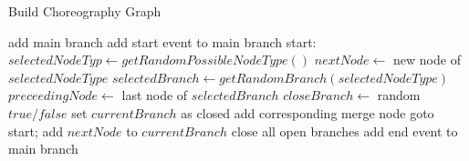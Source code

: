 \documentclass[a4paper, 11pt, oneside, BCOR1cm,toc=chapterentrywithdots]{scrbook}
\begin{document}
\begin{algorithm}
\caption{Build Choreography Graph}
\label{alg2}
\begin{algorithmic}[1]
\STATE add main branch %
\STATE add start event to main branch
\STATE start:
\STATE $selectedNodeTyp \leftarrow getRandomPossibleNodeType()$
\STATE $nextNode \leftarrow$ new node of $selectedNodeType$
\STATE $selectedBranch \leftarrow getRandomBranch(selectedNodeType)$
\STATE $preceedingNode \leftarrow$ last node of $selectedBranch$
\STATE $closeBranch \leftarrow$ random $true/false$
\STATE set $currentBranch$ as closed
\STATE add corresponding merge node
\STATE goto start;
\ENDIF 
\ENDIF
\STATE add $nextNode$ to $currentBranch$
\ENDWHILE
\STATE close all open branches
\STATE add end event to main branch
\
\end{algorithmic}
\end{algorithm}
\end{document}
